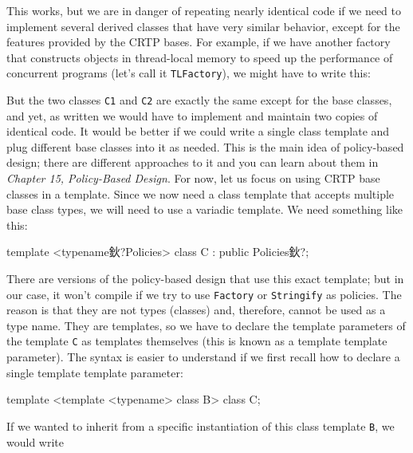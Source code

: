 \begin{code}
// Example 10
class C1 : public Stringify<C1>, public Factory<C1> {鈥;
\end{code}

This works, but we are in danger of repeating nearly identical code if we need to implement several derived classes that have very similar behavior, except for the features provided by the CRTP bases. For example, if we have another factory that constructs objects in thread-local memory to speed up the performance of concurrent programs (let's call it \texttt{TLFactory}), we might have to write this:

\begin{code}
class C2 : public Stringify<C2>, public TLFactory<C2> {鈥;
\end{code}

But the two classes \texttt{C1} and \texttt{C2} are exactly the same except for the base classes, and yet, as written we would have to implement and maintain two copies of identical code. It would be better if we could write a single class template and plug different base classes into it as needed. This is the main idea of policy-based design; there are different approaches to it and you can learn about them in \emph{Chapter 15, Policy-Based Design}. For now, let us focus on using CRTP base classes in a template. Since we now need a class template that accepts multiple base class types, we will need to use a variadic template. We need something like this:

\begin{code}
template <typename鈥?Policies>
class C : public Policies鈥?{};
\end{code}

There are versions of the policy-based design that use this exact template; but in our case, it won't compile if we try to use \texttt{Factory} or \texttt{Stringify} as policies. The reason is that they are not types (classes) and, therefore, cannot be used as a type name. They are templates, so we have to declare the template parameters of the template \texttt{C} as templates themselves (this is known as a template template parameter). The syntax is easier to understand if we first recall how to declare a single template template parameter:

\begin{code}
template <template <typename> class B> class C;
\end{code}

If we wanted to inherit from a specific instantiation of this class template \texttt{B}, we would write

